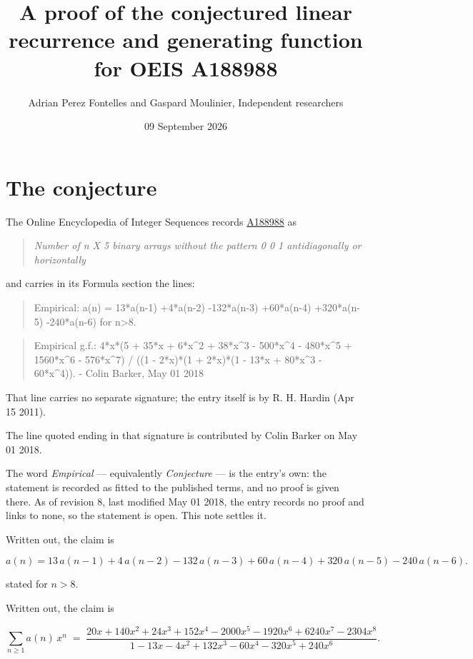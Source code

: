 \documentclass[11pt]{article}
\title{A proof of the conjectured linear recurrence and generating function for OEIS A188988}
\author{Adrian Perez Fontelles and Gaspard Moulinier, Independent researchers}
\date{09 September 2026}
\theoremstyle{definition}
\begin{document}
\maketitle
\section{The conjecture}

The Online Encyclopedia of Integer Sequences records \href{https://oeis.org/A188988}{A188988} as

\begin{quote}\itshape Number of n X 5 binary arrays without the pattern 0 0 1 antidiagonally or horizontally\end{quote}

and carries in its Formula section the lines:

\begin{quote}\ttfamily Empirical: a(n) = 13*a(n-1) +4*a(n-2) -132*a(n-3) +60*a(n-4) +320*a(n-5) -240*a(n-6) for n>8.\end{quote}

\begin{quote}\ttfamily Empirical g.f.: 4*x*(5 + 35*x + 6*x\textasciicircum{}2 + 38*x\textasciicircum{}3 - 500*x\textasciicircum{}4 - 480*x\textasciicircum{}5 + 1560*x\textasciicircum{}6 - 576*x\textasciicircum{}7) / ((1 - 2*x)*(1 + 2*x)*(1 - 13*x + 80*x\textasciicircum{}3 - 60*x\textasciicircum{}4)). - Colin Barker, May 01 2018\end{quote}

That line carries no separate signature; the entry itself is by R. H. Hardin (Apr 15 2011).

The line quoted ending in that signature is contributed by Colin Barker on May 01 2018.

The word {\itshape Empirical} --- equivalently {\itshape Conjecture} --- is the entry's own: the statement is recorded as fitted to the published terms, and no proof is given there. As of revision 8, last modified May 01 2018, the entry records no proof and links to none, so the statement is open. This note settles it.

Written out, the claim is

\[a(n) = 13\,a(n-1) + 4\,a(n-2) - 132\,a(n-3) + 60\,a(n-4) + 320\,a(n-5) - 240\,a(n-6).\]

stated for $n > 8$.

Written out, the claim is

\[\sum_{n \ge 1} a(n)\,x^n \;=\; \frac{20x + 140x^{2} + 24x^{3} + 152x^{4} - 2000x^{5} - 1920x^{6} + 6240x^{7} - 2304x^{8}}{1 - 13x - 4x^{2} + 132x^{3} - 60x^{4} - 320x^{5} + 240x^{6}}.\]
\end{document}
